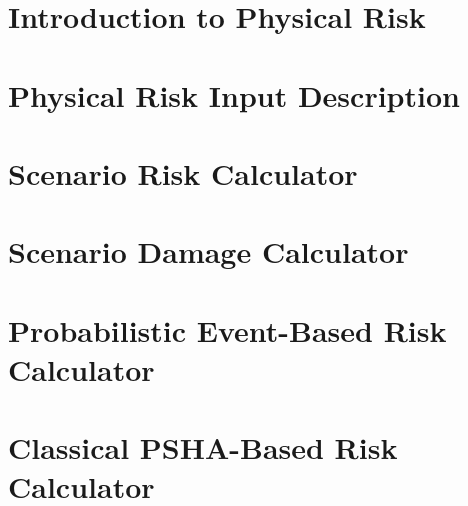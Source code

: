 \documentclass[11pt,a4paper,headings=small,dvips]{scrbook}
\begin{document}
\chapter{Introduction to Physical Risk}
	\label{chap:intrisk}
	
\chapter{Physical Risk Input Description}
	\label{chap:riskinput}
	
\chapter{Scenario Risk Calculator}
	\label{chap:scenario_risk}
	
\chapter{Scenario Damage Calculator}
	\label{chap:scenario_damage}
	
\chapter{Probabilistic Event-Based Risk Calculator}
	\label{chap:risk_prob_event_based}
	
\chapter{Classical PSHA-Based Risk Calculator}
	\label{chap:risk_psha_based}
	
\end{document}
